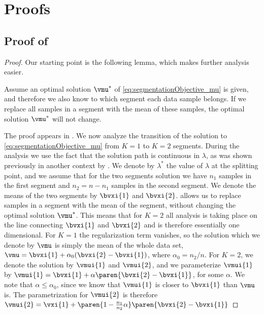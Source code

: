 \section{Proofs}\label{sec:suppMaterial}

\subsection{Proof of }\label{sec:proof_lem:analyticalSolutionK=2}
\begin{proof}
Our starting point is the following lemma, which makes further analysis easier.
\begin{lemma}\label{lem:replaceSamplesWithMean}
Assume an optimal solution $\vmu^*$ of \eqref{eq:segmentationObjective_mu} is given, and therefore we also know to which
segment each data sample belongs. If we replace all samples in a segment with the mean of these samples, the optimal
solution $\vmu^*$ will not change.
\end{lemma}
The proof appears in . %
We now analyze the transition of the solution to \eqref{eq:segmentationObjective_mu} from $K=1$ to $K=2$ segments.
During the analysis we use the fact that the solution path is continuous in $\lambda$, as was shown previously in
another context by \cite{Chi:2013arXiv}. We denote by $\lambda^*$ the value of $\lambda$ at the splitting point, and we
assume that for the two segments solution we have $n_1$ samples in the first segment and $n_2=n-n_1$ samples in the second
segment. We denote the means of the two segments by $\bvxi{1}$ and $\bvxi{2}$.  allows
us to replace samples in a segment with the mean of the segment, without changing the optimal solution $\vmu^*$.
This means that for $K=2$ all analysis is taking place on the line connecting $\bvxi{1}$ and $\bvxi{2}$ and is
therefore essentially one dimensional. For $K=1$ the regularization term vanishes, so the solution which we denote
by $\vmu$ is simply the mean of the whole data set, $\vmu=\bvxi{1}+\alpha_0(\bvxi{2}-\bvxi{1})$,
where $\alpha_0=n_2/n$. For $K=2$, we denote the solution by $\vmui{1}$ and $\vmui{2}$,
and we parameterize $\vmui{1}$ by $\vmui{1}=\bvxi{1}+\alpha\paren{\bvxi{2}-\bvxi{1}}$, for some $\alpha$.
We note that $\alpha\leq\alpha_0$, since we know that $\vmui{1}$ is closer to $\bvxi{1}$ than $\vmu$ is.
The parametrization for $\vmui{2}$ is therefore $\vmui{2}=\vxi{1}+\paren{1-\frac{n_1}{n_2}\alpha}\paren{\bvxi{2}-\bvxi{1}}$

\end{proof}
